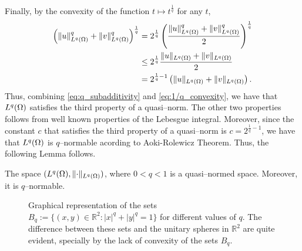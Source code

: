 Finally, by the convexity of the function $t\mapsto t^{\frac{1}{q}}$ for any $t$,
\begin{equation}\label{eq:1/q_convexity}
\begin{aligned}
\left(\lVert u \rVert_{L^q(\Omega)}^q + \lVert v \rVert_{L^q(\Omega)}^q\right)^{\frac{1}{q}}
&= 2^{\frac{1}{q}}
\left(\frac{\lVert u \rVert_{L^q(\Omega)}^q+ \lVert v \rVert_{L^q(\Omega)}^q}{2}\right)^{\frac{1}{q}}\\
&\le 2^{\frac{1}{q}}
\frac{\lVert u \rVert_{L^q(\Omega)}+ \lVert v \rVert_{L^q(\Omega)}}{2}\\
&= 2^{\frac{1}{q}-1}
\left(\lVert u \rVert_{L^q(\Omega)}+ \lVert v \rVert_{L^q(\Omega)}\right).
\end{aligned}
\end{equation}
Thus, combining \eqref{eq:q_subadditivity} and \eqref{eq:1/q_convexity}, we have that
$L^q(\Omega)$ satisfies the third property of a quasi--norm. The other two properties
follows from well known properties of the Lebesgue integral. Moreover,
since the constant $c$ that satisfies the third property of a quasi--norm
is $c=2^{\frac{1}{q}-1}$, we have that $L^q(\Omega)$ is $q$--normable acording to
Aoki-Rolewicz Theorem. Thus, the following Lemma follows.
\begin{lemma}
	The space $(L^q(\Omega),\lVert \cdot \rVert_{L^q(\Omega)})$, where $0<q<1$ is a quasi--normed space. Moreover, it is $q$--normable.
\end{lemma}


	\begin{figure}[H]
\centering
{}
\caption{Graphical representation of the sets $B_q:=\{(x,y)\in\mathbb{R}^2: |x|^q+|y|^q=1\}$ for different 
values of $q$. The difference between these sets and the unitary spheres in $\mathbb{R}^2$ are
quite evident, specially by the lack of convexity of the sets $B_q$.}
\label{fig:lq_balls}
\end{figure}


